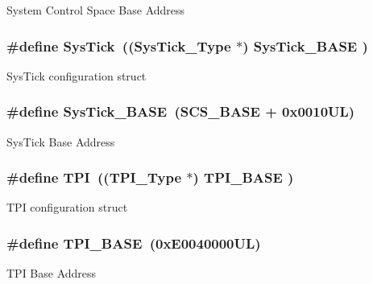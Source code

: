 System Control Space Base Address \hypertarget{group__CMSIS__core__base_gacd96c53beeaff8f603fcda425eb295de}{
\subsubsection[{Sys\-Tick}]{\setlength{\rightskip}{0pt plus 5cm}\#define Sys\-Tick~(({\bf Sys\-Tick\-\_\-\-Type}   $\ast$)     {\bf Sys\-Tick\-\_\-\-B\-A\-S\-E}  )}}\label{group__CMSIS__core__base_gacd96c53beeaff8f603fcda425eb295de}
Sys\-Tick configuration struct \hypertarget{group__CMSIS__core__base_ga58effaac0b93006b756d33209e814646}{
\subsubsection[{Sys\-Tick\-\_\-\-B\-A\-S\-E}]{\setlength{\rightskip}{0pt plus 5cm}\#define Sys\-Tick\-\_\-\-B\-A\-S\-E~({\bf S\-C\-S\-\_\-\-B\-A\-S\-E} +  0x0010\-U\-L)}}\label{group__CMSIS__core__base_ga58effaac0b93006b756d33209e814646}
Sys\-Tick Base Address \hypertarget{group__CMSIS__core__base_ga8b4dd00016aed25a0ea54e9a9acd1239}{
\subsubsection[{T\-P\-I}]{\setlength{\rightskip}{0pt plus 5cm}\#define T\-P\-I~(({\bf T\-P\-I\-\_\-\-Type}       $\ast$)     {\bf T\-P\-I\-\_\-\-B\-A\-S\-E}      )}}\label{group__CMSIS__core__base_ga8b4dd00016aed25a0ea54e9a9acd1239}
T\-P\-I configuration struct \hypertarget{group__CMSIS__core__base_ga2b1eeff850a7e418844ca847145a1a68}{
\subsubsection[{T\-P\-I\-\_\-\-B\-A\-S\-E}]{\setlength{\rightskip}{0pt plus 5cm}\#define T\-P\-I\-\_\-\-B\-A\-S\-E~(0x\-E0040000\-U\-L)}}\label{group__CMSIS__core__base_ga2b1eeff850a7e418844ca847145a1a68}
T\-P\-I Base Address 